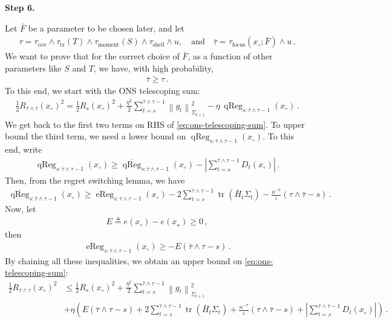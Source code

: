 \documentclass{article}
\newcommand{\proofstepinline}[1]{%
    {\normalfont\normalsize\bfseries\color{blue!55!black}Step #1.}\enspace
}
\newcommand{\tr}{\operatorname{tr}}
\newcommand{\1}{\mathbf 1}
\newcommand{\eps}{\varepsilon}
\newcommand{\normm}[2]{\left\lVert #1\right\rVert_{#2}}
\begin{document}
\proofstepinline{6}
Let $\bar{F}$ be a parameter to be chosen later, and let
\begin{align}
    \tau = \tau_{\mathrm{cov}} \wedge \tau_{\mathrm{tr}}(T) \wedge \tau_{\mathrm{moment}}(S) \wedge \tau_{\mathrm{shell}} \wedge u,\quad\text{and}\quad \bar{\tau} = \tau_{\mathrm{focus}}(x_{\circ}; \bar{F}) \wedge u\,.
\end{align}
We want to prove that for the correct choice of $\bar{F}$, as a function of other parameters like $S$ and $T$, we have, with high probability,
\begin{align}
    \bar{\tau} \geq \tau\,.
\end{align}
To this end, we start with the ONS telescoping sum:
\begin{align}
    \frac{1}{2}R_{\bar{\tau}\wedge \tau}(x_{\circ})^2
    =
    \frac{1}{2}R_s(x_{\circ})^2
    +\frac{\eta^2}{2}
    \sum_{t=s}^{\bar{\tau}\wedge \tau-1} \normm{g_t}{\Sigma_{t+1}}^2
    -\eta\, \operatorname{qReg}_{s:\bar{\tau}\wedge \tau-1}(x_{\circ})\,.
    \label{eq:ons-telescoping-sum}
\end{align}
We get back to the first two terms on RHS of \eqref{eq:ons-telescoping-sum}.
To upper bound the third term, we need a lower bound on $\operatorname{qReg}_{s:\bar{\tau}\wedge \tau-1}(x_{\circ})$.
To this end, write
\begin{align}
    \operatorname{qReg}_{s:\bar{\tau}\wedge \tau-1}(x_{\circ})
    \geq
    \overline{\operatorname{qReg}}_{s:\bar{\tau}\wedge \tau-1}(x_{\circ})
    - \left|
    \sum_{t=s}^{\bar{\tau}\wedge \tau-1} D_t(x_{\circ})
    \right|\,.
\end{align}
Then, from the regret switching lemma, we have
\begin{align}
    \overline{\operatorname{qReg}}_{s:\bar{\tau}\wedge \tau-1}(x_{\circ})
    \geq
    \operatorname{eReg}_{s:\bar{\tau}\wedge \tau-1}(x_{\circ})
    - 2\sum_{t=s}^{\bar{\tau}\wedge \tau-1} \tr\left(\bar{H}_t\Sigma_t\right) - \frac{n^{-7}}{\eps}(\tau \wedge \bar{\tau} - s)\,.
\end{align}
Now, let
\begin{align}
    E \triangleq e(x_{\circ}) - e(x_\star) \geq 0\,,
\end{align}
then
\begin{align}
    \operatorname{eReg}_{s:\bar{\tau}\wedge \tau-1}(x_{\circ})
    \geq
    -E(\bar{\tau}\wedge \tau - s)\,.
\end{align}
By chaining all these inequalities, we obtain an upper bound on \eqref{eq:ons-telescoping-sum}:
\begin{align}
    \frac{1}{2}R_{\bar{\tau}\wedge \tau}(x_{\circ})^2
     & \leq
    \frac{1}{2}R_s(x_{\circ})^2
    +\frac{\eta^2}{2}
    \sum_{t=s}^{\bar{\tau}\wedge \tau-1} \normm{g_t}{\Sigma_{t+1}}^2                                                                                                                  \\
     & +\eta \left( E(\bar{\tau}\wedge \tau - s) + 2\sum_{t=s}^{\bar{\tau}\wedge \tau-1} \tr\left(\bar{H}_t\Sigma_t\right) + \frac{n^{-7}}{\eps}(\tau \wedge \bar{\tau} - s) + \left|
    \sum_{t=s}^{\bar{\tau}\wedge \tau-1} D_t(x_{\circ})
    \right| \right)\,.
\end{align}
\end{document}
